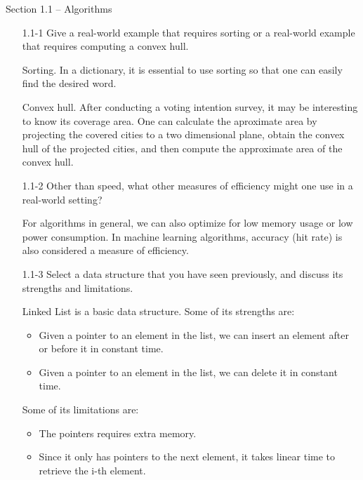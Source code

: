 \documentclass{report}
\makeatletter
\renewenvironment{framed}{%
 \def\FrameCommand##1{\hskip\@totalleftmargin
 \fboxsep=\FrameSep\fbox{##1}}%
 \MakeFramed {\advance\hsize-\width
   \@totalleftmargin\z@ \linewidth\hsize
   \@setminipage}}%
 {\par\unskip\endMakeFramed}
\makeatother
\begin{document}
\small

{\large Section 1.1 {--} Algorithms}

\begin{enumerate}

\item[1.1{-}1] Give a real-world example that requires sorting or
  a real-world example that requires computing a convex hull.

\begin{framed}
Sorting. In a dictionary, it is essential to use sorting so that one
can easily find the desired word.

Convex hull. After conducting a voting intention survey, it may be
interesting to know its coverage area. One can calculate the aproximate area by
projecting the covered cities to a two dimensional plane, obtain the convex hull
of the projected cities, and then compute the approximate area of the convex
hull.
\end{framed}

\item[1.1{-}2] Other than speed, what other measures of efficiency might
  one use in a real-world setting?

\begin{framed}
For algorithms in general, we can also optimize for low memory usage or low
power consumption. In machine learning algorithms, accuracy (hit rate) is also
considered a measure of efficiency.
\end{framed}

\item[1.1{-}3] Select a data structure that you have seen previously,
  and discuss its strengths and limitations.

\begin{framed}
Linked List is a basic data structure. Some of its strengths are:

\begin{itemize}
\item Given a pointer to an element in the list, we can insert an element after
  or before it in constant time.
\item Given a pointer to an element in the list, we can delete it in constant
  time.
\end{itemize}

Some of its limitations are:

\begin{itemize}
\item The pointers requires extra memory.
\item Since it only has pointers to the next element, it takes linear time to
  retrieve the i-th element.
\end{itemize}
\end{framed}


\end{enumerate}
\end{document}
